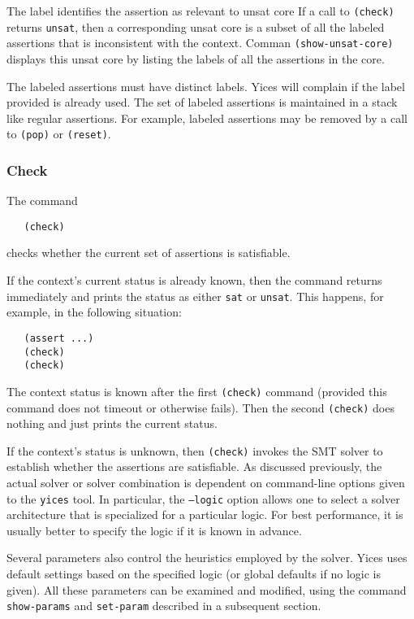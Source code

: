 \documentclass[11pt,twoside,fleqn,openright,titlepage]{cslreport}
\begin{document}
\medskip\noindent
The label identifies the assertion as relevant to unsat core If a call
to \texttt{(check)} returns \texttt{unsat}, then a corresponding unsat
core is a subset of all the labeled assertions that is inconsistent
with the context. Comman \texttt{(show-unsat-core)} displays this
unsat core by listing the labels of all the assertions in the core.

\medskip\noindent The labeled assertions must have distinct
labels. Yices will complain if the label provided is already used. The
set of labeled assertions is maintained in a stack like regular
assertions. For example, labeled assertions may be removed by a call
to \texttt{(pop)} or \texttt{(reset)}.


\subsubsection*{Check}

The command
\begin{small}
\begin{verbatim}
   (check)
\end{verbatim}
\end{small}
checks whether the current set of assertions is satisfiable.

\medskip\noindent
If the context's current status is already known, then the command
returns immediately and prints the status as either \texttt{sat} or
\texttt{unsat}. This happens, for example, in the following situation:
\begin{small}
\begin{verbatim}
   (assert ...)
   (check)
   (check)
\end{verbatim}
\end{small}
The context status is known after the first \texttt{(check)} command
(provided this command does not timeout or otherwise fails). Then the
second \texttt{(check)} does nothing and just prints the current
status.

\medskip\noindent
If the context's status is unknown, then \texttt{(check)} invokes the
SMT solver to establish whether the assertions are satisfiable. As
discussed previously, the actual solver or solver combination is
dependent on command-line options given to the \texttt{yices} tool. In
particular, the \texttt{--logic} option allows one to select a solver
architecture that is specialized for a particular logic. For best
performance, it is usually better to specify the logic if it is known
in advance.

\medskip\noindent Several parameters also control the heuristics employed
by the solver. Yices uses default settings based on the specified logic
(or global defaults if no logic is given). All these parameters can be
examined and modified, using the command \texttt{show-params} and
\texttt{set-param} described in a subsequent section.
\end{document}

